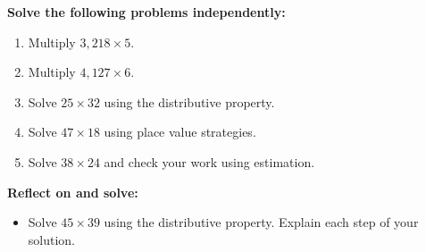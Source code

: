 \documentclass[12pt]{article}
\begin{document}
\vspace{1em}

\begin{tcolorbox}[colframe=black!60, colback=white, 
coltitle=black, colbacktitle=black!15, fonttitle=\bfseries\Large, 
title=Independent Practice, halign title=center, left=10pt, right=10pt, top=10pt, bottom=10pt]
\textbf{Solve the following problems independently:}
\begin{enumerate}[itemsep=3em]
    \item Multiply \( 3,218 \times 5 \). \vspace{1cm}
    \item Multiply \( 4,127 \times 6 \). \vspace{1cm}
    \item Solve \( 25 \times 32 \) using the distributive property. \vspace{1cm}
    \item Solve \( 47 \times 18 \) using place value strategies. \vspace{1cm}
    \item Solve \( 38 \times 24 \) and check your work using estimation. \vspace{3cm}
\end{enumerate}
\end{tcolorbox}


\begin{tcolorbox}[colframe=black!60, colback=white, 
coltitle=black, colbacktitle=black!15, fonttitle=\bfseries\Large, 
title=Exit Ticket, halign title=center, left=10pt, right=10pt, top=10pt, bottom=50pt]
\textbf{Reflect on and solve:}
\begin{itemize}
    \item Solve \( 45 \times 39 \) using the distributive property. Explain each step of your solution.
\end{itemize}
\end{tcolorbox}
\end{document}
